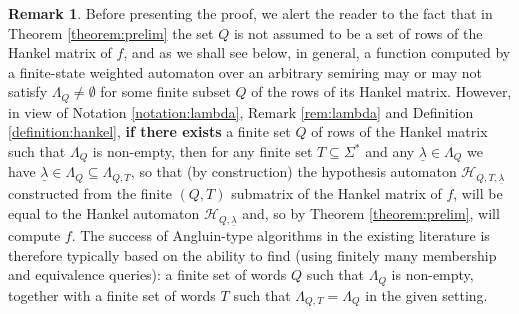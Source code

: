 \documentclass[10pt,a4paper]{amsart}
\theoremstyle{definition}
\newtheorem{rem}[thm]{Remark}
\numberwithin{equation}{section}
\numberwithin{theorem}{section}
\begin{document}
\begin{rem}
	\label{rem:rows}
Before presenting the proof, we alert the reader to the fact that in Theorem \ref{theorem:prelim} the set $Q$ is not assumed to be a set of rows of the Hankel matrix of $f$, and as we shall see below, in general, a function computed by a finite-state weighted automaton over an arbitrary semiring may or may not satisfy $\Lambda_Q \neq \emptyset$ for some finite subset $Q$ of the rows of its Hankel matrix.  However, in view of Notation \ref{notation:lambda}, Remark \ref{rem:lambda} and Definition \ref{definition:hankel}, \textbf{if there exists} a finite set $Q$ of rows of the Hankel matrix such that $\Lambda_Q$ is non-empty, then  for any finite set $T \subseteq \Sigma^*$ and any $\underline{\lambda} \in \Lambda_Q$ we have $\underline{\lambda} \in \Lambda_Q \subseteq \Lambda_{Q, T}$, so that (by construction) the hypothesis automaton $\mathcal{H}_{Q, T, \underline{\lambda}}$ constructed from the finite $(Q,T)$ submatrix of the Hankel matrix of $f$, will be equal to the Hankel automaton $\mathcal{H}_{Q, \underline{\lambda}}$ and, so by Theorem \ref{theorem:prelim}, will compute $f$. The success of Angluin-type algorithms in the existing literature is therefore typically based on the ability to find (using finitely many membership and equivalence queries): a finite set of words $Q$ such that $\Lambda_Q$ is non-empty, together with a finite set of words $T$ such that $\Lambda_{Q, T}=\Lambda_Q$ in the given setting.
\end{rem}	
\end{document}
